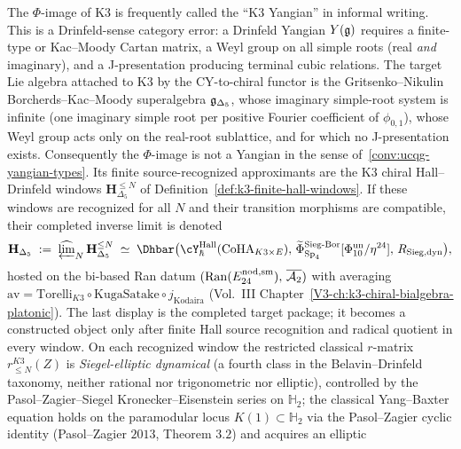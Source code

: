 \begin{remark}
\label{rem:k3-yangian-is-hall-drinfeld-double}%
%
%
The $\Phi$-image of K3 is frequently called the ``K3 Yangian'' in
informal writing. This is a Drinfeld-sense category error: a Drinfeld
Yangian $Y(\mathfrak{g})$ requires a finite-type or Kac--Moody Cartan matrix, a
Weyl group on all simple roots (real \emph{and} imaginary), and a
J-presentation producing terminal cubic relations. The target Lie algebra
attached to K3 by the CY-to-chiral functor is the Gritsenko--Nikulin
Borcherds--Kac--Moody superalgebra $\mathfrak{g}_{\Delta_5}$, whose imaginary
simple-root system is infinite (one imaginary simple root per positive
Fourier coefficient of $\phi_{0,1}$), whose Weyl group acts only on the
real-root sublattice, and for which no J-presentation exists.
Consequently the $\Phi$-image is not a Yangian in the sense
of~\cref{conv:ucqg-yangian-types}.  Its finite source-recognized
approximants are the K3 chiral Hall--Drinfeld windows
$\mathbf H_{\Delta_5}^{\le N}$ of
Definition~\ref{def:k3-finite-hall-windows}.  If these windows are
recognized for all $N$ and their transition morphisms are compatible,
their completed inverse limit is denoted
\[
 \mathbf{H}_{\Delta_5}
 \;:=\;
 \widehat{\varprojlim}_{N}\,\mathbf H_{\Delta_5}^{\le N}
 \;\simeq\;
 \Dhbar\bigl(\cY^{\mathrm{Hall}}_{\hbar}(\operatorname{CoHA}_{K3\times E}),\,
 \widetilde{\Phi}^{\mathrm{Sieg\text{-}Bor}}_{\mathrm{Sp}_4}[\Phi_{10}^{\mathrm{un}}/\eta^{24}],\,
 R_{\mathrm{Sieg,dyn}}\bigr),
\]
hosted on the bi-based Ran datum
$(\mathrm{Ran}(E^{\mathrm{nod,sm}}_{24}),\, \overline{\mathcal{A}_2})$ with averaging
$\mathrm{av} = \mathrm{Torelli}_{K3}\circ \mathrm{KugaSatake}\circ j_{\mathrm{Kodaira}}$
(Vol.~III Chapter~\ref{V3-ch:k3-chiral-bialgebra-platonic}).  The last
display is the completed target package; it becomes a constructed
object only after finite Hall source recognition and radical quotient
in every window.  On each recognized window the restricted classical
$r$-matrix $r^{K3}_{\le N}(Z)$ is \emph{Siegel-elliptic dynamical} (a fourth class
in the Belavin--Drinfeld taxonomy, neither rational nor trigonometric nor
elliptic), controlled by the Pasol--Zagier--Siegel Kronecker--Eisenstein
series on $\mathbb{H}_2$; the classical Yang--Baxter equation holds on the
paramodular locus $K(1)\subset \mathbb{H}_2$ via the Pasol--Zagier cyclic
identity (Pasol--Zagier $2013$, Theorem $3.2$) and acquires an elliptic

\end{remark}
